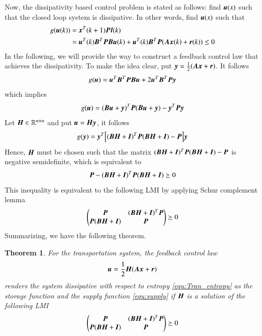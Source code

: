 \documentclass[preprint,authoryear,12pt]{elsarticle}
\renewcommand{\vec}[1]{\mbox{\boldmath$#1$}}
\newcommand{\mat}[1]{\mbox{\boldmath$#1$}}
\newtheorem{thm}{Theorem}
\begin{document}
Now, the dissipativity based control problem is stated as follows:
find $\vec{u}(x)$ such that the closed loop system is dissipative. In
other words, find $\vec{u}(x)$ such that
\begin{align*}
g(\vec{u}(k))&=\vec{x}^T(k+1)\mat{P}\vec{l}(k)\\
&=\vec{u}^T(k)\mat{B}^T\mat{P}\mat{B}\vec{u}(k)
+\vec{u}^T(k)\mat{B}^T\mat{P}(\mat{A}\vec{x}(k)+\vec{r}(k))\leq 0
\end{align*}
In the following, we will provide the way to construct a feedback
control law that achieves the dissipativity. To make the idea clear,
put $\vec{y}=\frac{1}{2}(\mat{A}\vec{x}+\vec{r})$. It follows 
\begin{equation}\label{pbc}
g(\vec{u})=\vec{u}^T\mat{B}^T\mat{P}\mat{B}\vec{u}+2\vec{u}^T\mat{B}^T\mat{P}\vec{y}
\end{equation}
which implies
$$g(\vec{u})=(\mat{B}\vec{u}
+\vec{y})^T \mat{P} (\mat{B}\vec{u}
+\vec{y})-\vec{y}^T
\mat{P}\vec{y}$$
Let $\mat{H}\in\mathbb{R}^{n\times n}$ and put
$\vec{u}=\mat{H}\vec{y}$, it follows
$$g(\vec{y})= \vec{y}^T\Bigl[(\mat{B}\mat{H}+\mat{I})^T \mat{P}
(\mat{B}\mat{H}+\mat{I})-\mat{P}\Bigr]\vec{y}
$$
Hence, $\mat{H}$ must be chosen such that the matrix
$(\mat{B}\mat{H}+\mat{I})^T \mat{P}
(\mat{B}\mat{H}+\mat{I})-\mat{P}$ is negative
semidefinite, which is equivalent to
$$\mat{P}-(\mat{B}\mat{H}+\mat{I})^T \mat{P}
(\mat{B}\mat{H}+\mat{I})\succeq 0$$
This inequality is equivalent to the following LMI by applying Schur
complement lemma \citep{boyd_linear_1994}
$$\begin{pmatrix}
\mat{P}& (\mat{B}\mat{H}+\mat{I})^T \mat{P} \\
\mat{P} (\mat{B}\mat{H}+\mat{I})  & \mat{P}
\end{pmatrix}\succeq 0$$
Summarizing, we have the following theorem. 

\begin{thm}\label{thm:pbc}
For the transportation system, the feedback control law
\begin{equation}
\label{equ:feedback}
\vec{u}=\frac{1}{2}\mat{H}(\mat{A}\vec{x}+\vec{r})
\end{equation}
renders the system dissipative with respect to
entropy \eqref{equ:Tran_entropy} as the storage function and the
supply function \eqref{equ:supply} if $\mat{H}$ is a solution of the
following LMI
\begin{equation}\label{equ:lmi}
\begin{pmatrix}
\mat{P}& (\mat{B}\mat{H}+\mat{I})^T \mat{P} \\
\mat{P} (\mat{B}\mat{H}+\mat{I})  & \mat{P}
\end{pmatrix}\succeq 0
\end{equation}
\end{thm}
\end{document}
